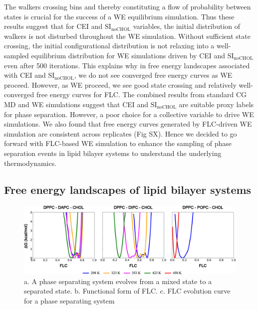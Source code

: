 \documentclass{biophys-new}
\begin{document}
The walkers crossing bins and thereby constituting a flow of probability between states is crucial for the success of a WE equilibrium simulation\cite{Zuckerman2017}.
Thus these results suggest that for CEI and $\text{SI}_{\text{noCHOL}}$ variables, the initial distribution of walkers is not disturbed throughout the WE simulation.
Without sufficient state crossing, the initial configurational distribution is not relaxing into a well-sampled equilibrium distribution for WE simulations driven by CEI and $\text{SI}_{\text{noCHOL}}$ even after 500 iterations. 
This explains why in free energy landscapes associated with CEI and $\text{SI}_{\text{noCHOL}}$, we do not see converged free energy curves as WE proceed.
However, as WE proceed, we see good state crossing and relatively well-converged free energy curves for FLC. 
The combined results from standard CG MD and WE simulations suggest that CEI and $\text{SI}_{\text{noCHOL}}$ are suitable proxy labels for phase separation. However, a poor choice for a collective variable to drive WE simulations.
We also found that free energy curves generated by FLC-driven WE simulation are consistent across replicates (Fig SX).
Hence we decided to go forward with FLC-based WE simulation to enhance the sampling of phase separation events in lipid bilayer systems to understand the underlying thermodynamics.
\\ 
\subsection*{Free energy landscapes of lipid bilayer systems}

\begin{figure}[hbt!]
\centering
\includegraphics[width=1\linewidth]{Figures/Main/5/placeholder.jpg}
\caption{a. A phase separating system evolves from a mixed state to a separated state. b. Functional form of FLC. c. FLC evolution curve for a phase separating system}
\label{figs5:view}
\end{figure}
\end{document}
